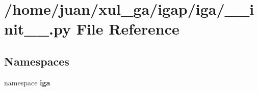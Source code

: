 \section{/home/juan/xul\_\-ga/igap/iga/\_\-\_\-init\_\-\_\-.py File Reference}
\label{iga_2____init_____8py}
\subsection*{Namespaces}
\begin{CompactItemize}
\item 
namespace {\bf iga}
\end{CompactItemize}
